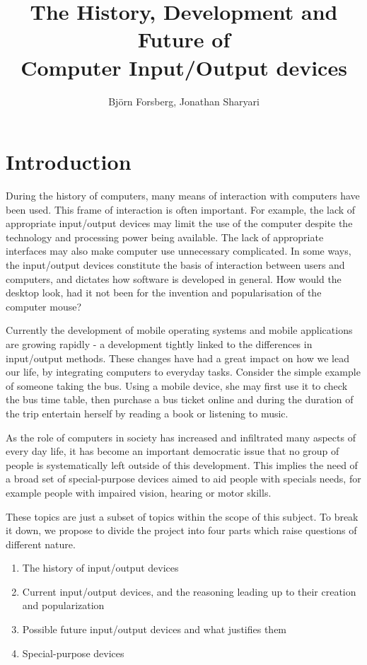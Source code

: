 \documentclass[a4paper,10pt]{article}
\title{\textbf{The History, Development and Future of \\
	Computer Input/Output devices}}
\author{Bj{\"o}rn Forsberg, Jonathan Sharyari}
\begin{document}
\maketitle




\section{Introduction}
During the history of computers, many means of interaction with computers have been used. This frame of interaction is often important. For example, the lack of appropriate input/output devices may limit the use of the computer despite the technology and processing power being available. The lack of appropriate interfaces may also make computer use unnecessary complicated. In some ways, the input/output devices constitute the basis of interaction between users and computers, and dictates how software is developed in general. How would the desktop look, had it not been for the invention and popularisation of the computer mouse? 

Currently the development of mobile operating systems and mobile applications are growing rapidly - a development tightly linked to the differences in input/output methods. These changes have had a great impact on how we lead our life, by integrating computers to everyday tasks. Consider the simple example of someone taking the bus. Using a mobile device, she may first use it to check the bus time table, then purchase a bus ticket online and during the duration of the trip entertain herself by reading a book or listening to music.

As the role of computers in society has increased and infiltrated many aspects of every day life, it has become an important democratic issue that no group of people is systematically left outside of this development. This implies the need of a broad set of special-purpose devices aimed to aid people with specials needs, for example people with impaired vision, hearing or motor skills. 

These topics are just a subset of topics within the scope of this subject. To break it down, we propose to divide the project into four parts which raise questions of different nature.
\begin{enumerate}
\item
The history of input/output devices
\item
Current input/output devices, and the reasoning leading up to their creation and popularization
\item
Possible future input/output devices and what justifies them
\item
Special-purpose devices
\end{enumerate}
\end{document}
